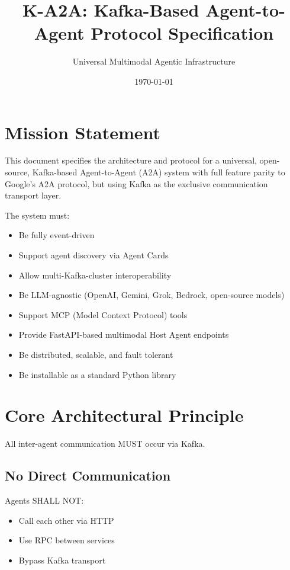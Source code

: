 \documentclass[12pt]{article}
\title{\textbf{K-A2A: Kafka-Based Agent-to-Agent Protocol Specification}}
\author{Universal Multimodal Agentic Infrastructure}
\date{\today}
\begin{document}
\maketitle
\tableofcontents
\newpage

\section{Mission Statement}

This document specifies the architecture and protocol for a universal, open-source, Kafka-based Agent-to-Agent (A2A) system with full feature parity to Google's A2A protocol, but using Kafka as the exclusive communication transport layer.

The system must:

\begin{itemize}
    \item Be fully event-driven
    \item Support agent discovery via Agent Cards
    \item Allow multi-Kafka-cluster interoperability
    \item Be LLM-agnostic (OpenAI, Gemini, Grok, Bedrock, open-source models)
    \item Support MCP (Model Context Protocol) tools
    \item Provide FastAPI-based multimodal Host Agent endpoints
    \item Be distributed, scalable, and fault tolerant
    \item Be installable as a standard Python library
\end{itemize}

\section{Core Architectural Principle}

All inter-agent communication MUST occur via Kafka.

\subsection{No Direct Communication}
Agents SHALL NOT:
\begin{itemize}
    \item Call each other via HTTP
    \item Use RPC between services
    \item Bypass Kafka transport
\end{itemize}
\end{document}
